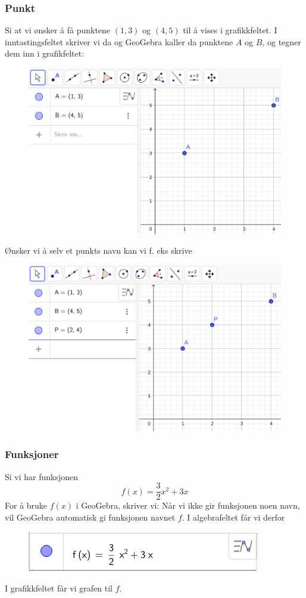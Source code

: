 \subsubsection{Punkt}
Si at vi ønsker å få punktene $ (1,3) $ og $ (4,5) $ til å vises i grafikkfeltet. I inntastingsfeltet skriver vi da
og \vs
{}
GeoGebra kaller da punktene $ A $ og $ B $, og tegner dem inn i grafikfeltet:
\begin{figure}[H]
	\centering
	\includegraphics[scale=0.15]{pointAandB}
\end{figure}
Ønsker vi å selv et punkts navn kan vi f. eks skrive
\begin{figure}[H]
	\centering
	\includegraphics[scale=0.15]{pointP}
\end{figure}
\subsubsection{Funksjoner}
Si vi har funksjonen 
\[f(x)= \frac{3}{2} x^2 + 3x \]
For å bruke $ f(x) $ i GeoGebra, skriver vi:
Når vi ikke gir funksjonen noen navn, vil GeoGebra automatisk gi funksjonen navnet $ f $. I algebrafeltet får vi derfor
\begin{figure}[H]
	\centering
	\includegraphics[scale=0.5]{skrivf}
\end{figure}
I grafikkfeltet får vi grafen til $ f $. \vsk

